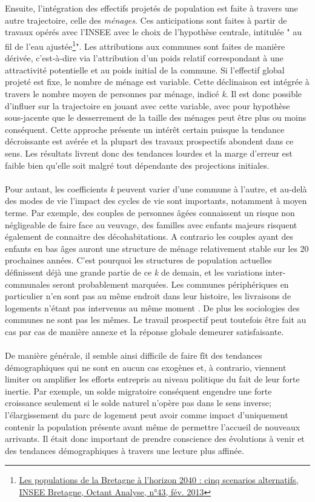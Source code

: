 \documentclass{bredele}
\begin{document}
\\\\
Ensuite, l’intégration des effectifs projetés de population est faite à travers une autre trajectoire, celle des \textit{ménages}. Ces anticipations sont faites à partir de travaux opérés avec l’INSEE avec le choix de l’hypothèse centrale, intitulée " au fil de l'eau ajustée\footnote{\href{https://www.insee.fr/fr/statistiques/fichier/1291303/OCTANA43.pdf}{Les populations de la Bretagne à l'horizon 2040 : cinq scenarios alternatifs, INSEE Bretagne, Octant Analyse, n°43, fév. 2013}}". Les attributions aux communes sont faites de manière dérivée, c'est-à-dire via l’attribution d’un poids relatif correspondant à une attractivité potentielle et au poids initial de la commune. Si l’effectif global projeté est fixe, le nombre de ménage est variable. Cette déclinaison est intégrée à travers le nombre moyen de personnes par ménage, indicé \textit{k}. Il est donc possible d’influer sur la trajectoire en jouant avec cette variable, avec pour hypothèse sous-jacente que le desserrement  de la taille des ménages peut être plus ou moins conséquent. Cette approche présente un intérêt certain puisque la tendance décroissante est avérée et la plupart des travaux prospectifs abondent dans ce sens. Les résultats livrent donc des tendances lourdes et la marge d’erreur est faible bien qu'elle soit malgré tout dépendante des projections initiales.
\\\\Pour autant, les coefficients \textit{k} peuvent varier d’une commune à l’autre, et au-delà des modes de vie l’impact des cycles de vie sont importants, notamment à moyen terme. Par exemple, des couples de personnes âgées connaissent un risque non négligeable de faire face au veuvage, des familles avec enfants majeurs risquent également de connaitre des décohabitations. A contrario les couples ayant des enfants en bas âges auront une structure de ménage relativement stable sur les 20 prochaines années. C’est pourquoi les structures de population actuelles définissent déjà une grande partie de ce \textit{k} de demain, et les variations inter-communales seront probablement marquées. Les communes périphériques en particulier n’en sont pas au même endroit dans leur histoire, les livraisons de logements n’étant pas intervenus au même moment . De plus les sociologies des communes ne sont pas les mêmes. Le travail prospectif peut toutefois être fait au cas par cas de manière annexe et la réponse globale demeurer satisfaisante.
\\\\De manière générale, il semble ainsi difficile de faire fît des tendances démographiques qui ne sont en aucun cas exogènes et, à contrario, viennent limiter ou amplifier les efforts entrepris au niveau politique du fait de leur forte inertie. Par exemple, un solde migratoire conséquent engendre une forte croissance seulement si le solde naturel n'opère pas dans le sens inverse; l'élargissement du parc de logement peut avoir comme impact d'uniquement contenir la population présente avant même de permettre l'accueil de nouveaux arrivants. Il était donc important de prendre conscience des évolutions à venir et des tendances démographiques à travers une lecture plus affinée.
\end{document}
